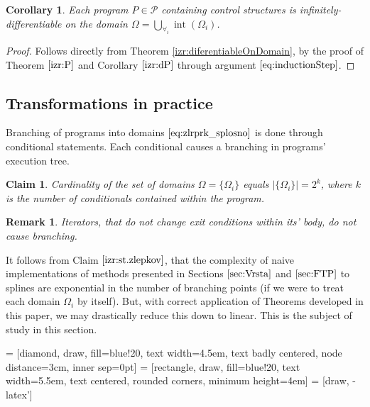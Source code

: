 \documentclass{article}
\newcommand{\dP}{\mathcal{P}}
\DeclareMathOperator{\interior}{int}
\newtheorem{trditev}{Claim}[section]
\newtheorem{opomba}{Remark}[section]
\newtheorem{corollary}{Corollary}[section]
\begin{document}
 \begin{corollary}
\label{izr:infDiferentiableOnDomain}
  Each program $P\in\dP$ containing control structures is infinitely-differentiable on the domain $\Omega=\bigcup\limits_{\forall_i}\interior(\Omega_i)$.
 \end{corollary}
 \begin{proof}
 Follows directly from Theorem \ref{izr:diferentiableOnDomain}, by the proof of Theorem $\ref{izr:P}$ and Corollary $\ref{izr:dP}$ through argument $\eqref{eq:inductionStep}$.
 \end{proof}

\subsection{Transformations in practice} \label{sec:TransInPractice}

Branching of programs into domains $\eqref{eq:zlrprk_splosno}$ is done through conditional statements. Each conditional causes a branching in programs' execution tree.

\begin{trditev}\label{izr:st.zlepkov}
Cardinality of the set of domains $\Omega=\{\Omega_i\}$ equals $\lvert\{\Omega_i \}\rvert=2^k$, where $k$ is the number of conditionals contained within the program.
\end{trditev}
\begin{opomba}
Iterators, that do not change exit conditions within its' body, do not cause branching.
\end{opomba}

It follows from Claim $\ref{izr:st.zlepkov}$, that the complexity of naive implementations of methods presented in Sections $\ref{sec:Vrsta}$ and $\ref{sec:FTP}$ to splines are exponential in the number of branching points (if we were to treat each domain $\Omega_i$ by itself). But, with correct application of Theorems developed in this paper, we may drastically reduce this down to linear. This is the subject of study in this section.
\vspace{10px}

 = [diamond, draw, fill=blue!20, 
    text width=4.5em, text badly centered, node distance=3cm, inner sep=0pt]
 = [rectangle, draw, fill=blue!20, 
    text width=5.5em, text centered, rounded corners, minimum height=4em]
 = [draw, -latex']
\end{document}
